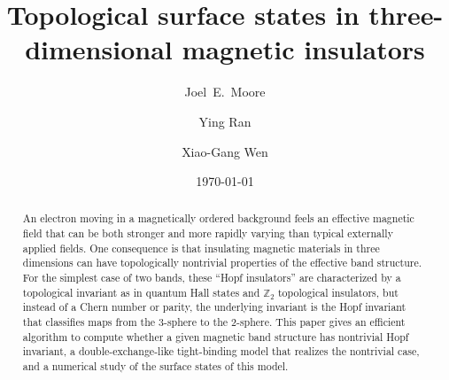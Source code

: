 \documentclass[prl,showpacs,superscriptaddress,twocolumn,preprintnumbers,amssymb,amsfonts]{revtex4}
\begin{document}

\def\beq{\begin{equation}}
\def\eeq{\end{equation}}
\def\beqn{\begin{eqnarray}}
\def\eeqn{\end{eqnarray}}
\def\etal{\emph{et al.}}
\renewcommand{\v}[1]{\boldsymbol{#1}}
\newcommand{\up}{\uparrow}
\newcommand{\down}{\downarrow} 

\title{Topological surface states in three-dimensional magnetic insulators}
\author{Joel~E.~Moore}
 
\author{Ying Ran}
\author{Xiao-Gang Wen}
\date{\today}



\begin{abstract}
An electron moving in a magnetically ordered background feels an effective magnetic field that can be both stronger and more rapidly varying than typical externally applied fields.  One consequence is that insulating magnetic materials in three dimensions can have topologically nontrivial properties of the effective band structure.  For the simplest case of two bands, these ``Hopf insulators'' are characterized by a topological invariant as in quantum Hall states and $\mathbb{Z}_2$ topological insulators, but instead of a Chern number or parity, the underlying invariant is the Hopf invariant that classifies maps from the 3-sphere to the 2-sphere.  This paper gives an efficient algorithm to compute whether a given magnetic band structure has nontrivial Hopf invariant, a double-exchange-like tight-binding model that realizes the nontrivial case, and a numerical study of the surface states of this model.
\end{abstract}
\maketitle
\end{document}
